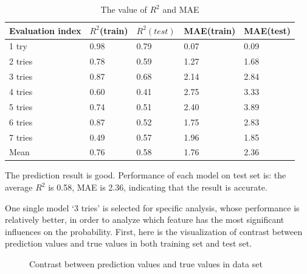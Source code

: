 \documentclass[
  journal=medium,
  manuscript=Report,
  year=2023,
  volume=37,
]{cup-journal}
\begin{document}
\begin{table}[hbt!]
    \begin{threeparttable}
    \caption{The value of $R^2$ and MAE}
    \label{MAE}
    \begin{tabular}{lllll}
    \toprule
    \headrow Evaluation index & $R^2$(train)  & $R^2(test)$ & MAE(train) & MAE(test)\\ 
    \midrule
    1 try & 0.98 & 0.79 & 0.07 & 0.09 \\ 
    \midrule
    2 tries & 0.78 & 0.59 & 1.27 & 1.68 \\ 
    \midrule
    3 tries & 0.87 & 0.68 & 2.14 & 2.84 \\ 
    \midrule
    4 tries & 0.60 & 0.41 & 2.75 & 3.33 \\ 
    \midrule
    5 tries & 0.74 & 0.51 & 2.40 & 3.89 \\ 
    \midrule
    6 tries & 0.87 & 0.52 & 1.75 & 2.83 \\ 
    \midrule
    7 tries & 0.49 & 0.57 & 1.96 & 1.85 \\ 
    \midrule
    Mean & 0.76 & 0.58 & 1.76 & 2.36 \\ 
    \bottomrule 
    \end{tabular}
    \end{threeparttable}
\end{table}

The prediction result is good. Performance of each model on test set is: the average $R^2$ is 0.58, MAE is 2.36, indicating that the result is accurate.

One single model ‘3 tries’ is selected for specific analysis, whose performance is relatively better, in order to analyze which feature has the most significant influences on the probability. First, here is the visualization of contrast between prediction values and true values in both training set and test set.

\begin{figure}[!htbp]
    \centering
    \hfill
    \caption{Contrast between prediction values and true values in data set}
    \label{combine2}
\end{figure}  
\end{document}
